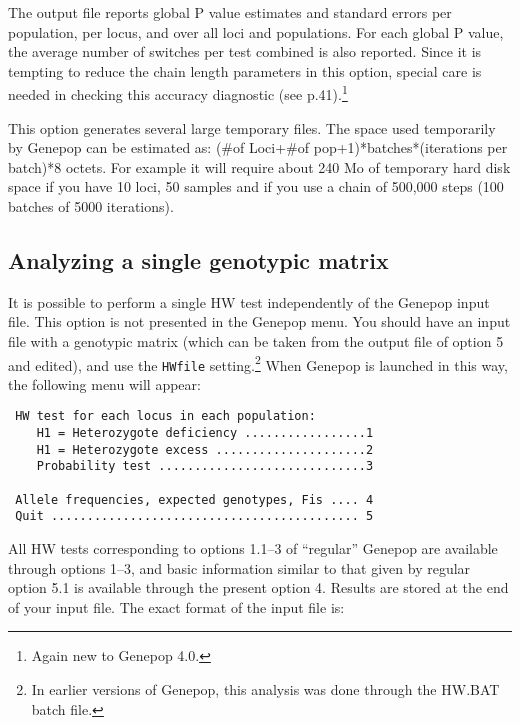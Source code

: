 \documentclass[
  12pt,
]{book}
\begin{document}
The output file reports global P value estimates and standard errors per population, per locus, and over all loci and populations. For each global P value, the average number of switches per test combined is also reported. Since it is tempting to reduce the chain length parameters in this option, special care is needed in checking this accuracy diagnostic (see p.41).\footnote{Again new to Genepop 4.0.}

This option generates several large temporary files. The space used temporarily by Genepop can be estimated as: (\#of Loci+\#of pop+1)*batches*(iterations per batch)*8 octets. For example it will require about 240 Mo of temporary hard disk space if you have 10 loci, 50 samples and if you use a chain of 500,000 steps (100 batches of 5000 iterations).

\hypertarget{analyzing-a-single-genotypic-matrix}{%
\subsection{Analyzing a single genotypic matrix}\label{analyzing-a-single-genotypic-matrix}}

It is possible to perform a single HW test independently of the Genepop input file. This option is not presented in the Genepop menu. You should have an input file with a genotypic matrix (which can be taken from the output file of option 5 and edited), and use the \texttt{HWfile} setting.\footnote{In earlier versions of Genepop, this analysis was done through the HW.BAT batch file.} When Genepop is launched in this way, the following menu will appear:

\begin{verbatim}
 HW test for each locus in each population:
    H1 = Heterozygote deficiency .................1
    H1 = Heterozygote excess .....................2
    Probability test .............................3

 Allele frequencies, expected genotypes, Fis .... 4
 Quit ........................................... 5
\end{verbatim}

All HW tests corresponding to options 1.1--3 of ``regular'' Genepop are available through options 1--3, and basic information similar to that given by regular option 5.1 is available through the present option 4. Results are stored at the end of your input file. The exact format of the input file is:
\end{document}
